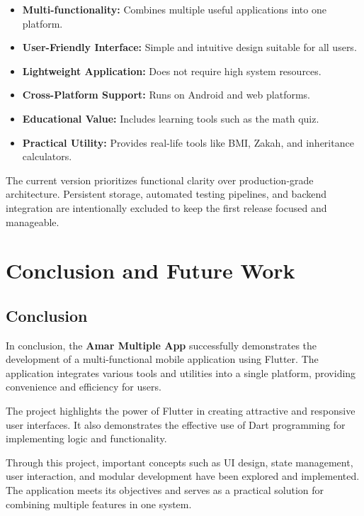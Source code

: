 \documentclass{article}
\begin{document}
\begin{itemize}
\item \textbf{Multi-functionality:} Combines multiple useful applications into one platform.
\item \textbf{User-Friendly Interface:} Simple and intuitive design suitable for all users.
\item \textbf{Lightweight Application:} Does not require high system resources.
\item \textbf{Cross-Platform Support:} Runs on Android and web platforms.
\item \textbf{Educational Value:} Includes learning tools such as the math quiz.
\item \textbf{Practical Utility:} Provides real-life tools like BMI, Zakah, and inheritance calculators.
\end{itemize}
\begin{insightbox}[Limitations]
The current version prioritizes functional clarity over production-grade architecture. Persistent storage, automated testing pipelines, and backend integration are intentionally excluded to keep the first release focused and manageable.
\end{insightbox}

\section{Conclusion and Future Work}

\subsection{Conclusion}

In conclusion, the \textbf{Amar Multiple App} successfully demonstrates the development of a multi-functional mobile application using Flutter. The application integrates various tools and utilities into a single platform, providing convenience and efficiency for users.

The project highlights the power of Flutter in creating attractive and responsive user interfaces. It also demonstrates the effective use of Dart programming for implementing logic and functionality.

Through this project, important concepts such as UI design, state management, user interaction, and modular development have been explored and implemented. The application meets its objectives and serves as a practical solution for combining multiple features in one system.
\end{document}
